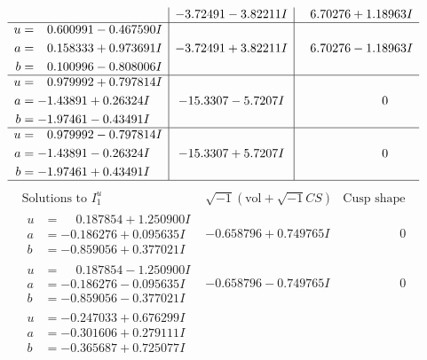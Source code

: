 \documentclass[1p]{elsarticle_modified}
\theoremstyle{definition}
\newcommand{\I}{\sqrt{-1}}
\begin{document}
$$\begin{array}{c|c|c}
 & -3.72491 - 3.82211 I & \phantom{-}6.70276 + 1.18963 I \\ \hline\begin{aligned}
u &= \phantom{-}0.600991 - 0.467590 I \\
a &= \phantom{-}0.158333 + 0.973691 I \\
b &= \phantom{-}0.100996 - 0.808006 I\end{aligned}
 & -3.72491 + 3.82211 I & \phantom{-}6.70276 - 1.18963 I \\ \hline\begin{aligned}
u &= \phantom{-}0.979992 + 0.797814 I \\
a &= -1.43891 + 0.26324 I \\
b &= -1.97461 - 0.43491 I\end{aligned}
 & -15.3307 - 5.7207 I & \phantom{-0.000000 } 0 \\ \hline\begin{aligned}
u &= \phantom{-}0.979992 - 0.797814 I \\
a &= -1.43891 - 0.26324 I \\
b &= -1.97461 + 0.43491 I\end{aligned}
 & -15.3307 + 5.7207 I & \phantom{-0.000000 } 0\\
 \hline 
 \end{array}$$\newpage$$\begin{array}{c|c|c}  
\text{Solutions to }I^u_{1}& \I (\text{vol} + \sqrt{-1}CS) & \text{Cusp shape}\\
 \hline 
\begin{aligned}
u &= \phantom{-}0.187854 + 1.250900 I \\
a &= -0.186276 + 0.095635 I \\
b &= -0.859056 + 0.377021 I\end{aligned}
 & -0.658796 + 0.749765 I & \phantom{-0.000000 } 0 \\ \hline\begin{aligned}
u &= \phantom{-}0.187854 - 1.250900 I \\
a &= -0.186276 - 0.095635 I \\
b &= -0.859056 - 0.377021 I\end{aligned}
 & -0.658796 - 0.749765 I & \phantom{-0.000000 } 0 \\ \hline\begin{aligned}
u &= -0.247033 + 0.676299 I \\
a &= -0.301606 + 0.279111 I \\
b &= -0.365687 + 0.725077 I\end{aligned}

\end{array}$$
\end{document}
